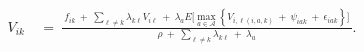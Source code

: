 \begin{equation}
\begin{split}
    V_{ik} \ 
    & = 
    \ \frac{
        \ f_{ik} \ + \ \sum_{\ell \neq k} \lambda_{k\ell} V_{i\ell} \ + \ \lambda_{a} E\Big[ \underset{a \in \mathcal{A}}{\max} \left\{ V_{i,\ell(i, a, k)} \ + \ \psi_{iak} \ + \ \epsilon_{iak} \right\} \Big] \ 
    }{
        \rho \ + \ \sum_{\ell \neq k} \lambda_{k\ell} \ + \ \lambda_{a}
    }.
\end{split}
\label{Equation:Firms-Problem_Value-Function}
\end{equation}